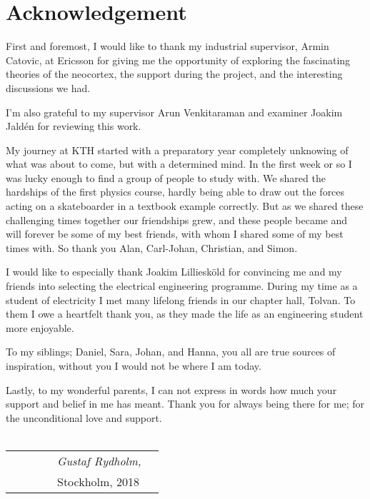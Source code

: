 \section*{Acknowledgement}
First and foremost, I would like to thank my industrial supervisor, Armin Catovic, at Ericsson for giving me the opportunity of exploring the fascinating theories of the neocortex, the support during the project, and the interesting discussions we had. 


I'm also grateful to my supervisor Arun Venkitaraman and examiner Joakim Jaldén for reviewing this work.


My journey at KTH started with a preparatory year completely unknowing of what was about to come, but with a determined mind. In the first week or so I was lucky enough to find a group of people to study with. We shared the hardships of the first physics course, hardly being able to draw out the forces acting on a skateboarder in a textbook example correctly. But as we shared these challenging times together our friendships grew, and these people became and will forever be some of my best friends, with whom I shared some of my best times with. So thank you Alan, Carl-Johan, Christian, and Simon.


I would like to especially thank Joakim Lilliesköld for convincing me and my friends into selecting the electrical engineering programme. During my time as a student of electricity I met many lifelong friends in our chapter hall, Tolvan. To them I owe a heartfelt thank you, as they made the life as an engineering student more enjoyable.


To my siblings; Daniel, Sara, Johan, and Hanna, you all are true sources of inspiration, without you I would not be where I am today. 


Lastly, to my wonderful parents, I can not express in words how much your support and belief in me has meant. Thank you for always being there for me; for the unconditional love and support.\\\\


\begin{table}[hb]
\begin{tabular}{lp{6.67cm}llll}
& & & & \textit{Gustaf Rydholm,} \\
& & & & Stockholm, 2018
\end{tabular}
\end{table}




